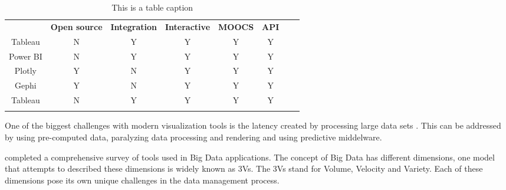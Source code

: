 \begin{center}
	\begin{table}[H]
		\caption{This is a table caption}
		\label{fig:tool_comparison}
		\begin{tabular}{ 
				!{\vrule width 1.1pt}
				c!{\vrule width 1pt}
				c!{\vrule width 1pt}
				c!{\vrule width 1pt}
				c!{\vrule width 1pt}
				c!{\vrule width 1pt}
				c!{\vrule width 1pt}
				c!{\vrule width 1pt}
				c!{\vrule width 1pt}}
			 \textbf{} &
			 \textbf{Open source} &
			 \textbf{Integration} &
			 \textbf{Interactive} &
			 \textbf{MOOCS} &
			 \textbf{API}
			\\ 
			Tableau & N & Y & Y & Y & Y
			\\ \hline
			Power BI & N & Y & Y & Y & Y
			\\ \hline
			Plotly & Y & N & Y & Y & Y
			\\ \hline
			Gephi & Y & N & Y & Y & Y
			\\ \hline
			Tableau & N & Y & Y & Y & Y
			\\ 
		\end{tabular}
	\end{table}
\end{center}

One of the biggest challenges with modern visualization tools is the latency created by processing large data sets \cite{ali2016big}. This can be addressed by using pre-computed data, paralyzing data processing and rendering and using predictive middelware.

\cite{caldarola2017big} completed a comprehensive survey of tools used in Big Data applications. The concept of Big Data has different dimensions, one model that attempts to described these dimensions is widely known as 3Vs. The 3Vs stand for Volume, Velocity and Variety.  Each of these dimensions pose its own unique challenges in the data management process.

